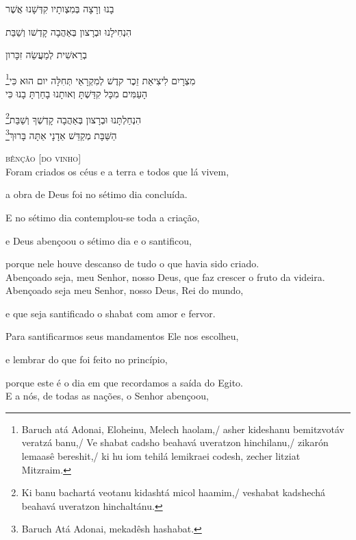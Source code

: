 בָנוּ וְרָצָה בְּמִצְותָיו קִדְּשָׁנוּ אֲשֶׁר

הִנְחִילָנוּ וּבְרָצון בְּאַהֲבָה קָדְשׁו וְשַׁבַּת

בְרֵאשִׁית לְמַעֲשֵׂה זִכָּרון

\footnote{Baruch atá Adonai, Eloheinu, Melech haolam,/ asher kideshanu bemitzvotáv veratzá banu,/ Ve shabat cadsho beahavá uveratzon hinchilanu,/ zikarón lemaasê bereshit,/ ki hu iom tehilá lemikraei codesh, zecher litziat Mitzraim.}מִצְרָיִם לִיצִיאַת זֵכֶר קדֶשׁ לְמִקְרָאֵי תְּחִלָּה יום הוּא כִּי\\[10pt]

הָעַמִּים מִכָּל קִדַּשְׁתָּ וְאותָנוּ בָחַרְתָּ בָנוּ כִּי

\footnote{Ki banu bachartá veotanu kidashtá micol haamim,/ veshabat kadshechá beahavá uveratzon hinchaltánu.}הִנְחַלְתָּנוּ וּבְרָצון בְּאַהֲבָה קָדְשְׁךָ וְשַׁבַּת \\[10pt]


\footnote{Baruch Atá Adonai, mekadêsh hashabat.}הַשַּׁבָּת מְקַדֵּשׁ אַדָנָי אַתָּה בָּרוּךְ

\movetooddpage
\raggedright

\vspace*{1cm}

\textsc{bênção [do vinho]}\\[15pt]

Foram criados os céus e a terra e todos que lá vivem,

a obra de Deus foi no sétimo dia concluída.

E no sétimo dia contemplou-se toda a criação,

e Deus abençoou o sétimo dia e o santificou,

porque nele houve descanso de tudo o que havia sido criado.\\[10pt]

Abençoado seja, meu Senhor, nosso Deus, que faz crescer o fruto da
videira.\\[10pt]

Abençoado seja meu Senhor, nosso Deus, Rei do mundo,

e que seja santificado o shabat com amor e fervor.

Para santificarmos seus mandamentos Ele nos escolheu,

e lembrar do que foi feito no princípio,

porque este é o dia em que recordamos a saída do Egito.\\[10pt]

E a nós, de todas as nações, o Senhor abençoou,

